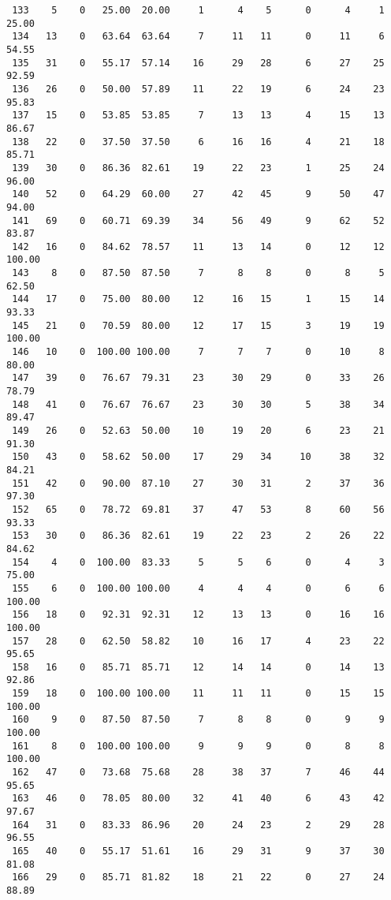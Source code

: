 \begin{verbatim}
 133    5    0   25.00  20.00     1      4    5      0      4     1    25.00
 134   13    0   63.64  63.64     7     11   11      0     11     6    54.55
 135   31    0   55.17  57.14    16     29   28      6     27    25    92.59
 136   26    0   50.00  57.89    11     22   19      6     24    23    95.83
 137   15    0   53.85  53.85     7     13   13      4     15    13    86.67
 138   22    0   37.50  37.50     6     16   16      4     21    18    85.71
 139   30    0   86.36  82.61    19     22   23      1     25    24    96.00
 140   52    0   64.29  60.00    27     42   45      9     50    47    94.00
 141   69    0   60.71  69.39    34     56   49      9     62    52    83.87
 142   16    0   84.62  78.57    11     13   14      0     12    12   100.00
 143    8    0   87.50  87.50     7      8    8      0      8     5    62.50
 144   17    0   75.00  80.00    12     16   15      1     15    14    93.33
 145   21    0   70.59  80.00    12     17   15      3     19    19   100.00
 146   10    0  100.00 100.00     7      7    7      0     10     8    80.00
 147   39    0   76.67  79.31    23     30   29      0     33    26    78.79
 148   41    0   76.67  76.67    23     30   30      5     38    34    89.47
 149   26    0   52.63  50.00    10     19   20      6     23    21    91.30
 150   43    0   58.62  50.00    17     29   34     10     38    32    84.21
 151   42    0   90.00  87.10    27     30   31      2     37    36    97.30
 152   65    0   78.72  69.81    37     47   53      8     60    56    93.33
 153   30    0   86.36  82.61    19     22   23      2     26    22    84.62
 154    4    0  100.00  83.33     5      5    6      0      4     3    75.00
 155    6    0  100.00 100.00     4      4    4      0      6     6   100.00
 156   18    0   92.31  92.31    12     13   13      0     16    16   100.00
 157   28    0   62.50  58.82    10     16   17      4     23    22    95.65
 158   16    0   85.71  85.71    12     14   14      0     14    13    92.86
 159   18    0  100.00 100.00    11     11   11      0     15    15   100.00
 160    9    0   87.50  87.50     7      8    8      0      9     9   100.00
 161    8    0  100.00 100.00     9      9    9      0      8     8   100.00
 162   47    0   73.68  75.68    28     38   37      7     46    44    95.65
 163   46    0   78.05  80.00    32     41   40      6     43    42    97.67
 164   31    0   83.33  86.96    20     24   23      2     29    28    96.55
 165   40    0   55.17  51.61    16     29   31      9     37    30    81.08
 166   29    0   85.71  81.82    18     21   22      0     27    24    88.89

\end{verbatim}

